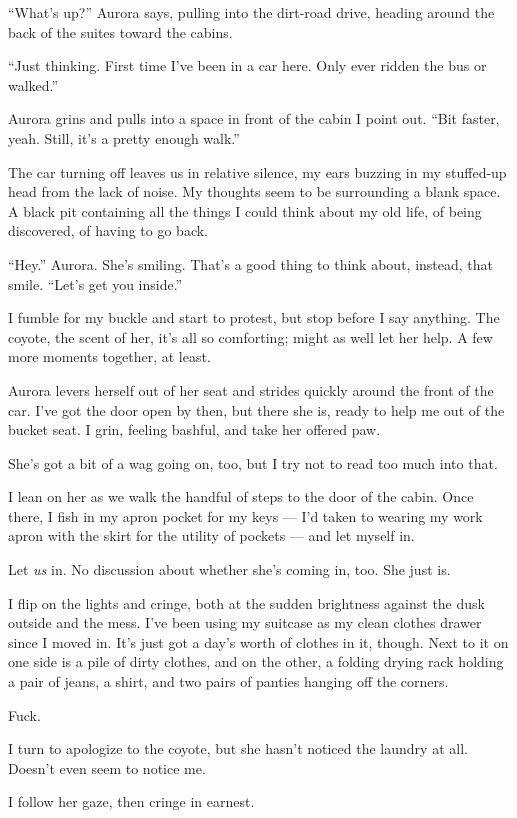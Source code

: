 ``What's up?'' Aurora says, pulling into the dirt-road drive, heading around the back of the suites toward the cabins.

``Just thinking. First time I've been in a car here. Only ever ridden the bus or walked.''

Aurora grins and pulls into a space in front of the cabin I point out. ``Bit faster, yeah. Still, it's a pretty enough walk.''

The car turning off leaves us in relative silence, my ears buzzing in my stuffed-up head from the lack of noise. My thoughts seem to be surrounding a blank space. A black pit containing all the things I could think about my old life, of being discovered, of having to go back.

``Hey.'' Aurora. She's smiling. That's a good thing to think about, instead, that smile. ``Let's get you inside.''

I fumble for my buckle and start to protest, but stop before I say anything. The coyote, the scent of her, it's all so comforting; might as well let her help. A few more moments together, at least.

Aurora levers herself out of her seat and strides quickly around the front of the car. I've got the door open by then, but there she is, ready to help me out of the bucket seat. I grin, feeling bashful, and take her offered paw.

She's got a bit of a wag going on, too, but I try not to read too much into that.

I lean on her as we walk the handful of steps to the door of the cabin. Once there, I fish in my apron pocket for my keys --- I'd taken to wearing my work apron with the skirt for the utility of pockets --- and let myself in.

Let \emph{us} in. No discussion about whether she's coming in, too. She just is.

I flip on the lights and cringe, both at the sudden brightness against the dusk outside and the mess. I've been using my suitcase as my clean clothes drawer since I moved in. It's just got a day's worth of clothes in it, though. Next to it on one side is a pile of dirty clothes, and on the other, a folding drying rack holding a pair of jeans, a shirt, and two pairs of panties hanging off the corners.

Fuck.

I turn to apologize to the coyote, but she hasn't noticed the laundry at all. Doesn't even seem to notice me.

I follow her gaze, then cringe in earnest.

